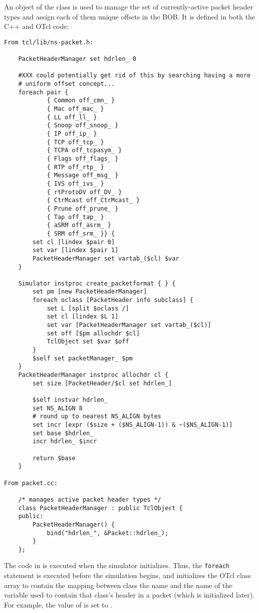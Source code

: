 An object of the class  is used
to manage the set of currently-active packet header types and
assign each of them unique offsets in the BOB.
It is defined in both the C++ and OTcl code:
\begin{small}
\begin{verbatim}
From tcl/lib/ns-packet.h:

	PacketHeaderManager set hdrlen_ 0

	#XXX could potentially get rid of this by searching having a more
	# uniform offset concept...
	foreach pair {
			{ Common off_cmn_ }
			{ Mac off_mac_ }
			{ LL off_ll_ }
			{ Snoop off_snoop_ }
			{ IP off_ip_ }
			{ TCP off_tcp_ }
			{ TCPA off_tcpasym_ }
			{ Flags off_flags_ }
			{ RTP off_rtp_ }
			{ Message off_msg_ }
			{ IVS off_ivs_ }
			{ rtProtoDV off_DV_ }
			{ CtrMcast off_CtrMcast_ }
			{ Prune off_prune_ }
			{ Tap off_tap_ }
			{ aSRM off_asrm_ }
			{ SRM off_srm_ }} {
		set cl [lindex $pair 0]
		set var [lindex $pair 1]
		PacketHeaderManager set vartab_($cl) $var
	}    

	Simulator instproc create_packetformat { } {
		set pm [new PacketHeaderManager]
		foreach oclass [PacketHeader info subclass] {
			set L [split $oclass /]
			set cl [lindex $L 1]
			set var [PacketHeaderManager set vartab_($cl)]
			set off [$pm allochdr $cl]
			TclObject set $var $off
		}       
		$self set packetManager_ $pm
	}    
	PacketHeaderManager instproc allochdr cl {
		set size [PacketHeader/$cl set hdrlen_]
	     
		$self instvar hdrlen_ 
		set NS_ALIGN 8
		# round up to nearest NS_ALIGN bytes
		set incr [expr ($size + ($NS_ALIGN-1)) & ~($NS_ALIGN-1)]
		set base $hdrlen_
		incr hdrlen_ $incr

		return $base
	}

From packet.cc:

	/* manages active packet header types */
	class PacketHeaderManager : public TclObject {
	public:
		PacketHeaderManager() {
			bind("hdrlen_", &Packet::hdrlen_);
		}
	};

\end{verbatim}
\end{small}
The code in  is executed when the
simulator initializes.
Thus, the {\tt foreach} statement is executed before the
simulation begins, and initializes the OTcl class array
 to contain the mapping between class
the name and the name of the variable used to contain
that class's header in a packet (which is initialized later).
For example, the value of  is set to
.

